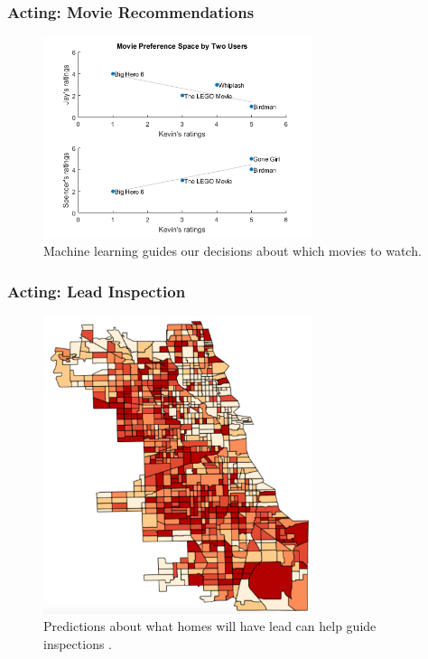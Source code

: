 \documentclass[10pt,mathserif]{beamer}
\begin{document}
\begin{frame}
  \frametitle{Acting: Movie Recommendations}
  \begin{figure}[ht]
    \centering
    \includegraphics[width=0.7\textwidth]{figures/netflix_regression}
    \caption{Machine learning guides our decisions about which movies to watch.}
  \end{figure}
\end{frame}

\begin{frame}
  \frametitle{Acting: Lead Inspection}
  \begin{figure}[ht]
    \centering
    \includegraphics[width=0.7\textwidth]{figures/lead_inspection}
    \caption{Predictions about what homes will have lead can help guide inspections \citep{potash2015predictive}. \label{fig:potash_predictive} }
  \end{figure}
\end{frame}
\end{document}
